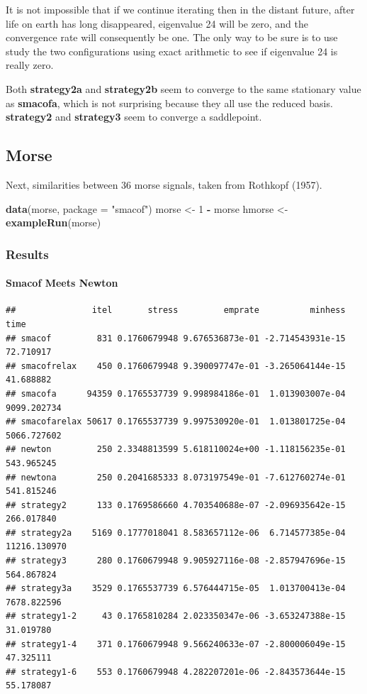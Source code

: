 \documentclass[
  12pt,
]{article}
\newenvironment{Shaded}{\begin{snugshade}}{\end{snugshade}}
\newcommand{\AttributeTok}[1]{\textcolor[rgb]{0.13,0.29,0.53}{#1}}
\newcommand{\DecValTok}[1]{\textcolor[rgb]{0.00,0.00,0.81}{#1}}
\newcommand{\FunctionTok}[1]{\textcolor[rgb]{0.13,0.29,0.53}{\textbf{#1}}}
\newcommand{\NormalTok}[1]{#1}
\newcommand{\OtherTok}[1]{\textcolor[rgb]{0.56,0.35,0.01}{#1}}
\newcommand{\SpecialCharTok}[1]{\textcolor[rgb]{0.81,0.36,0.00}{\textbf{#1}}}
\newcommand{\StringTok}[1]{\textcolor[rgb]{0.31,0.60,0.02}{#1}}
\begin{document}
It is not impossible that if we continue iterating then
in the distant future, after life on earth has long disappeared,
eigenvalue 24 will be zero, and the convergence rate will consequently
be one. The only way to be sure is to use study the two configurations
using exact arithmetic to see if eigenvalue 24 is really zero.

Both \textbf{strategy2a} and \textbf{strategy2b} seem to converge to the same stationary value as
\textbf{smacofa}, which is not surprising because they all use the reduced basis.
\textbf{strategy2} and \textbf{strategy3} seem to converge a saddlepoint.

\subsection{Morse}\label{morse}

Next, similarities between 36 morse signals, taken from Rothkopf (1957).

\begin{Shaded}
\begin{Highlighting}[]
\FunctionTok{data}\NormalTok{(morse, }\AttributeTok{package =} \StringTok{"smacof"}\NormalTok{)}
\NormalTok{morse }\OtherTok{\textless{}{-}} \DecValTok{1} \SpecialCharTok{{-}}\NormalTok{ morse}
\NormalTok{hmorse }\OtherTok{\textless{}{-}} \FunctionTok{exampleRun}\NormalTok{(morse)}
\end{Highlighting}
\end{Shaded}

\subsubsection{Results}\label{results-3}

\paragraph{Smacof Meets Newton}\label{smacof-meets-newton-3}

\begin{verbatim}
##               itel       stress         emprate          minhess         time
## smacof         831 0.1760679948 9.676536873e-01 -2.714543931e-15    72.710917
## smacofrelax    450 0.1760679948 9.390097747e-01 -3.265064144e-15    41.688882
## smacofa      94359 0.1765537739 9.998984186e-01  1.013903007e-04  9099.202734
## smacofarelax 50617 0.1765537739 9.997530920e-01  1.013801725e-04  5066.727602
## newton         250 2.3348813599 5.618110024e+00 -1.118156235e-01   543.965245
## newtona        250 0.2041685333 8.073197549e-01 -7.612760274e-01   541.815246
## strategy2      133 0.1769586660 4.703540688e-07 -2.096935642e-15   266.017840
## strategy2a    5169 0.1777018041 8.583657112e-06  6.714577385e-04 11216.130970
## strategy3      280 0.1760679948 9.905927116e-08 -2.857947696e-15   564.867824
## strategy3a    3529 0.1765537739 6.576444715e-05  1.013700413e-04  7678.822596
## strategy1-2     43 0.1765810284 2.023350347e-06 -3.653247388e-15    31.019780
## strategy1-4    371 0.1760679948 9.566240633e-07 -2.800006049e-15    47.325111
## strategy1-6    553 0.1760679948 4.282207201e-06 -2.843573644e-15    55.178087
\end{verbatim}
\end{document}
